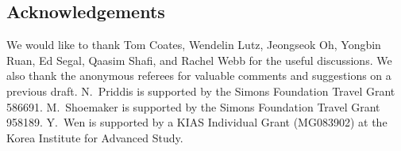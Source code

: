 \documentclass[pdftex]{sigma}
\numberwithin{equation}{section}
\begin{document}
\subsection*{Acknowledgements}
We would like to thank Tom Coates, Wendelin Lutz, Jeongseok Oh, Yongbin Ruan, Ed Segal, Qaasim Shafi, and Rachel Webb for the useful discussions. We also thank the anonymous referees for valuable comments and suggestions on a previous draft.
N.~Priddis is supported by the Simons Foundation Travel Grant 586691. M.~Shoemaker is supported by the Simons Foundation Travel Grant 958189.
Y.~Wen is supported by a KIAS Individual Grant (MG083902) at the Korea Institute for Advanced Study.




%
%
\end{document}
